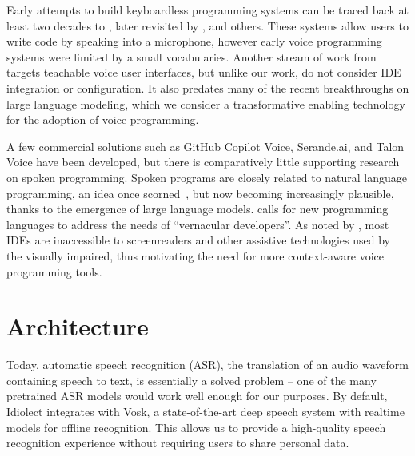 \documentclass{article}
\theoremstyle{plain}
\theoremstyle{definition}
\theoremstyle{remark}
\begin{document}
Early attempts to build keyboardless programming systems can be traced back at least two decades to \citet{leopold1997keyboardless}, later revisited by \citet{arnold2000programming}, \citet{begel2005spoken} and others. These systems allow users to write code by speaking into a microphone, however early voice programming systems were limited by a small vocabularies. Another stream of work from \citet{chkroun2019lia} targets teachable voice user interfaces, but unlike our work, do not consider IDE integration or configuration. It also predates many of the recent breakthroughs on large language modeling, which we consider a transformative enabling technology for the adoption of voice programming.

A few commercial solutions such as GitHub Copilot Voice, Serande.ai, and Talon Voice have been developed, but there is comparatively little supporting research on spoken programming. Spoken programs are closely related to natural language programming, an idea once scorned~\cite{dijkstra1979foolishness}, but now becoming increasingly plausible, thanks to the emergence of large language models. \citet{shaw2022myths} calls for new programming languages to address the needs of ``vernacular developers''. As noted by \citet{pandey2022accessibility}, most IDEs are inaccessible to screenreaders and other assistive technologies used by the visually impaired, thus motivating the need for more context-aware voice programming tools.

\section{Architecture}

Today, automatic speech recognition (ASR), the translation of an audio waveform containing speech to text, is essentially a solved problem -- one of the many pretrained ASR models would work well enough for our purposes. By default, Idiolect integrates with Vosk, a state-of-the-art deep speech system with realtime models for offline recognition. This allows us to provide a high-quality speech recognition experience without requiring users to share personal data.

\end{document}
